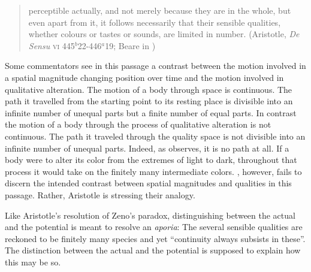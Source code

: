 \begin{quote}
perceptible actually, and not merely because they are in the whole, but even apart from it, it follows necessarily that their sensible qualities, whether colours or tastes or sounds, are limited in number. (Aristotle, \emph{De Sensu} \textsc{vi} 445\( ^{b} \)22-446\( ^{a} \)19; Beare in \citealt[18]{Barnes:1984uq})
\end{quote}

Some commentators see in this passage a contrast between the motion involved in a spatial magnitude changing position over time and the motion involved in qualitative alteration. The motion of a body through space is continuous. The path it travelled from the starting point to its resting place is divisible into an infinite number of unequal parts but a finite number of equal parts. In contrast the motion of a body through the process of qualitative alteration is not continuous. The path it traveled through the quality space is not divisible into an infinite number of unequal parts. Indeed, as \citet[395-396]{Sherry:1986uq} observes, it is no path at all. If a body were to alter its color from the extremes of light to dark, throughout that process it would take on the finitely many intermediate colors. \citet[128--129]{White:2002kx}, however, fails to discern the intended contrast between spatial magnitudes and qualities in this passage. Rather, Aristotle is stressing their analogy.

Like Aristotle's resolution of Zeno's paradox, distinguishing between the actual and the potential is meant to resolve an \emph{aporia}: The several sensible qualities are reckoned to be finitely many species and yet ``continuity always subsists in these''. The distinction between the actual and the potential is supposed to explain how this may be so. 

